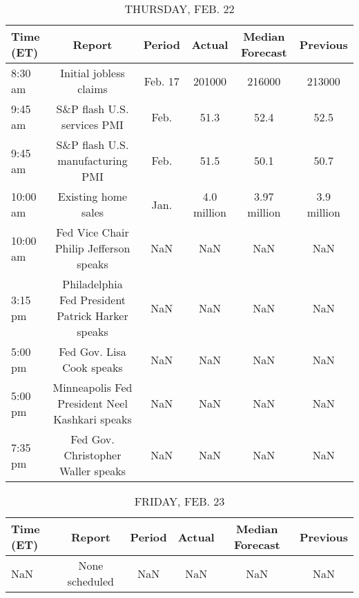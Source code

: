 \documentclass{article}%
\begin{document}
%


\begin{table}[htbp]%
\caption{THURSDAY, FEB. 22}%
\centering%
\begin{adjustbox}{width=1\textwidth}%
\begin{tabular}{lccccc}
\toprule
Time (ET) &                                           Report &  Period &      Actual & Median Forecast &    Previous \\
\midrule
  8:30 am &                           Initial jobless claims & Feb. 17 &      201000 &          216000 &      213000 \\
  9:45 am &                      S\&P flash U.S. services PMI &    Feb. &        51.3 &            52.4 &        52.5 \\
  9:45 am &                 S\&P flash U.S. manufacturing PMI &    Feb. &        51.5 &            50.1 &        50.7 \\
 10:00 am &                              Existing home sales &    Jan. & 4.0 million &    3.97 million & 3.9 million \\
 10:00 am &           Fed Vice Chair Philip Jefferson speaks &     NaN &         NaN &             NaN &         NaN \\
  3:15 pm & Philadelphia Fed President Patrick Harker speaks &     NaN &         NaN &             NaN &         NaN \\
  5:00 pm &                        Fed Gov. Lisa Cook speaks &     NaN &         NaN &             NaN &         NaN \\
  5:00 pm &   Minneapolis Fed President Neel Kashkari speaks &     NaN &         NaN &             NaN &         NaN \\
  7:35 pm &               Fed Gov. Christopher Waller speaks &     NaN &         NaN &             NaN &         NaN \\
\bottomrule
\end{tabular}
%
\end{adjustbox}%
\end{table}

%


\begin{table}[htbp]%
\caption{FRIDAY, FEB. 23}%
\centering%
\begin{adjustbox}{width=1\textwidth}%
\begin{tabular}{lccccc}
\toprule
Time (ET) &         Report & Period & Actual & Median Forecast & Previous \\
\midrule
      NaN & None scheduled &    NaN &    NaN &             NaN &      NaN \\
\bottomrule
\end{tabular}
%
\end{adjustbox}%
\end{table}
\end{document}
